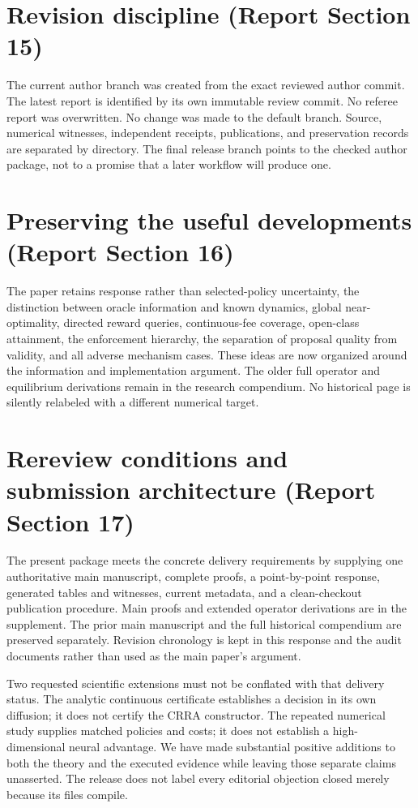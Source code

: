 \section{Revision discipline (Report Section 15)}
The current author branch was created from the exact reviewed author commit. The latest report is identified by its own immutable review commit. No referee report was overwritten. No change was made to the default branch. Source, numerical witnesses, independent receipts, publications, and preservation records are separated by directory. The final release branch points to the checked author package, not to a promise that a later workflow will produce one.

\section{Preserving the useful developments (Report Section 16)}
The paper retains response rather than selected-policy uncertainty, the distinction between oracle information and known dynamics, global near-optimality, directed reward queries, continuous-fee coverage, open-class attainment, the enforcement hierarchy, the separation of proposal quality from validity, and all adverse mechanism cases. These ideas are now organized around the information and implementation argument. The older full operator and equilibrium derivations remain in the research compendium. No historical page is silently relabeled with a different numerical target.

\section{Rereview conditions and submission architecture (Report Section 17)}
The present package meets the concrete delivery requirements by supplying one authoritative main manuscript, complete proofs, a point-by-point response, generated tables and witnesses, current metadata, and a clean-checkout publication procedure. Main proofs and extended operator derivations are in the supplement. The prior main manuscript and the full historical compendium are preserved separately. Revision chronology is kept in this response and the audit documents rather than used as the main paper's argument.

Two requested scientific extensions must not be conflated with that delivery status. The analytic continuous certificate establishes a decision in its own diffusion; it does not certify the CRRA constructor. The repeated numerical study supplies matched policies and costs; it does not establish a high-dimensional neural advantage. We have made substantial positive additions to both the theory and the executed evidence while leaving those separate claims unasserted. The release does not label every editorial objection closed merely because its files compile.

